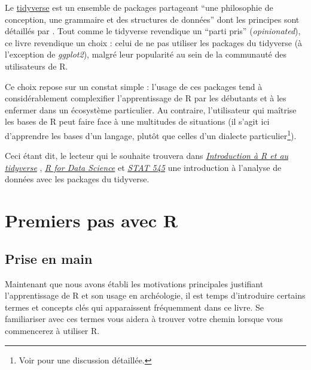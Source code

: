 \documentclass[
  french,
]{scrbook}
\begin{document}
\begin{tcolorbox}[fonttitle=\sffamily\bfseries\large,title=Remarque,colframe=darkblue]

Le \href{https://www.tidyverse.org/}{tidyverse} est un ensemble de packages partageant ``une philosophie de conception, une grammaire et des structures de données'' dont les principes sont détaillés par \textcite{wickham2019b}. Tout comme le tidyverse revendique un ``parti pris'' (\emph{opinionated}), ce livre revendique un choix : celui de ne pas utiliser les packages du tidyverse (à l'exception de \emph{ggplot2}), malgré leur popularité au sein de la communauté des utilisateurs de R.

Ce choix repose sur un constat simple : l'usage de ces packages tend à considérablement complexifier l'apprentissage de R par les débutants et à les enfermer dans un écosystème particulier. Au contraire, l'utilisateur qui maîtrise les bases de R peut faire face à une multitudes de situations (il s'agit ici d'apprendre les bases d'un langage, plutôt que celles d'un dialecte particulier\footnote{Voir \textcite{matloff2019} pour une discussion détaillée.}).

Ceci étant dit, le lecteur qui le souhaite trouvera dans \href{https://juba.github.io/tidyverse}{\emph{Introduction à R et au tidyverse}} \autocite{barnier2021}, \href{https://r4ds.had.co.nz/}{\emph{R for Data Science}} \autocite{wickham2016} et \href{https://stat545.com/}{\emph{STAT 545}} \autocite{bryan2020} une introduction à l'analyse de données avec les packages du tidyverse.

\end{tcolorbox}

\hypertarget{part-premiers-pas-avec-r}{%
\part{Premiers pas avec R}\label{part-premiers-pas-avec-r}}

\hypertarget{prise-en-main}{%
\chapter{Prise en main}\label{prise-en-main}}

Maintenant que nous avons établi les motivations principales justifiant l'apprentissage de R et son usage en archéologie, il est temps d'introduire certains termes et concepts clés qui apparaissent fréquemment dans ce livre. Se familiariser avec ces termes vous aidera à trouver votre chemin lorsque vous commencerez à utiliser R.
\end{document}
